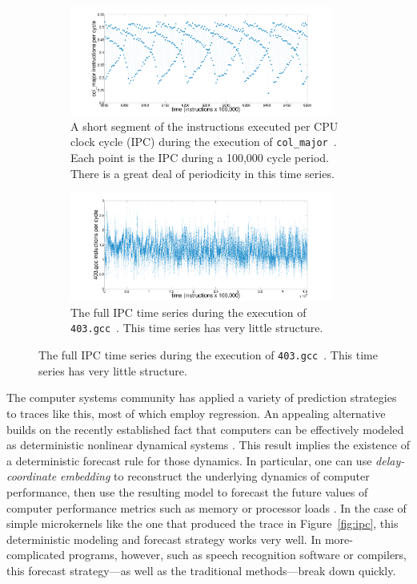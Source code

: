\documentclass{article}
\newcommand{\gcc}{{\tt 403.gcc}~}
\newcommand{\col}{{\tt col\_major}~}
\begin{document}
\begin{figure}[htbp]
  \centering
  \begin{subfigure}[t]{0.475\textwidth}
    \includegraphics[width=0.95\textwidth]{figs/colshortts}
    \caption{A short segment of the instructions executed per CPU clock cycle
    (IPC) during the execution of \col. Each point is the IPC during a 100,000
    cycle period. There is a great deal of periodicity in this time series.}
    \label{fig:col-ts}
  \end{subfigure}%
  \begin{subfigure}[t]{0.475\textwidth}
    \includegraphics[width=0.95\textwidth]{figs/gccfullts}
    \caption{The full IPC time series during the execution of \gcc. This time
    series has very little structure.}
    \label{fig:gcc-ts}
  \end{subfigure}
  \label{fig:sample-ts}
\end{figure}

The computer systems community has applied a variety of prediction
strategies to traces like this, most of which employ regression.  An
appealing alternative builds on the recently established fact that
computers can be effectively modeled as deterministic nonlinear
dynamical systems \cite{mytkowicz09}.  This result implies the
existence of a deterministic forecast rule for those dynamics.  In
particular, one can use \emph{delay-coordinate embedding} to
reconstruct the underlying dynamics of computer performance, then use
the resulting model to forecast the future values of computer
performance metrics such as memory or processor loads
\cite{josh-ida2011}.  In the case of simple microkernels like the one
that produced the trace in Figure~\ref{fig:ipc}, this deterministic
modeling and forecast strategy works very well.  In more-complicated
programs, however, such as speech recognition software or compilers,
this forecast strategy---as well as the traditional methods---break
down quickly.
\end{document}
